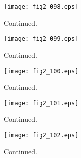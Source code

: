 \documentclass[preprint]{aastex}
\begin{document}
\setcounter{figure}{1}
\begin{figure}[t]
\centering
\texttt{[image: fig2\_098.eps]}
\caption{
Continued. 
}
\label{Fig2}
\end{figure}
\clearpage



\setcounter{figure}{1}
\begin{figure}[t]
\centering
\texttt{[image: fig2\_099.eps]}
\caption{
Continued. 
}
\label{Fig2}
\end{figure}
\clearpage



\setcounter{figure}{1}
\begin{figure}[t]
\centering
\texttt{[image: fig2\_100.eps]}
\caption{
Continued. 
}
\label{Fig2}
\end{figure}
\clearpage



\setcounter{figure}{1}
\begin{figure}[t]
\centering
\texttt{[image: fig2\_101.eps]}
\caption{
Continued. 
}
\label{Fig2}
\end{figure}
\clearpage



\setcounter{figure}{1}
\begin{figure}[t]
\centering
\texttt{[image: fig2\_102.eps]}
\caption{
Continued. 
}
\label{Fig2}
\end{figure}
\clearpage
\end{document}
